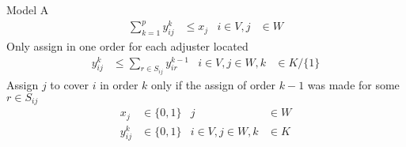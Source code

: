\begin{frame}[allowframebreaks]{Model A}{}
{\footnotesize
  \begin{align}
    \sum_{k = 1}^{p}{y_{ij}^{k}} & \leq x_j & i \in V, j &\in W
  \end{align}
  Only assign in one order for each adjuster located 
  \begin{align}
    y_{ij}^{k} &\leq \sum_{r\in S_{ij}}{y_{ir}^{k-1}} &  i \in V,j \in W, k &\in K/\{1\}
  \end{align}
  Assign $j$ to cover $i$ in order $k$ only if the assign of order $k-1$ was made for some  $r \in S_{ij}$
  \begin{align}
    x_{j} & \in \{0,1\}      &                  j &\in W \nonumber\\
    y_{ij}^{k} & \in \{0,1\} &  i \in V,j \in W,k &\in K \nonumber
  \end{align}
}
\end{frame}

%
